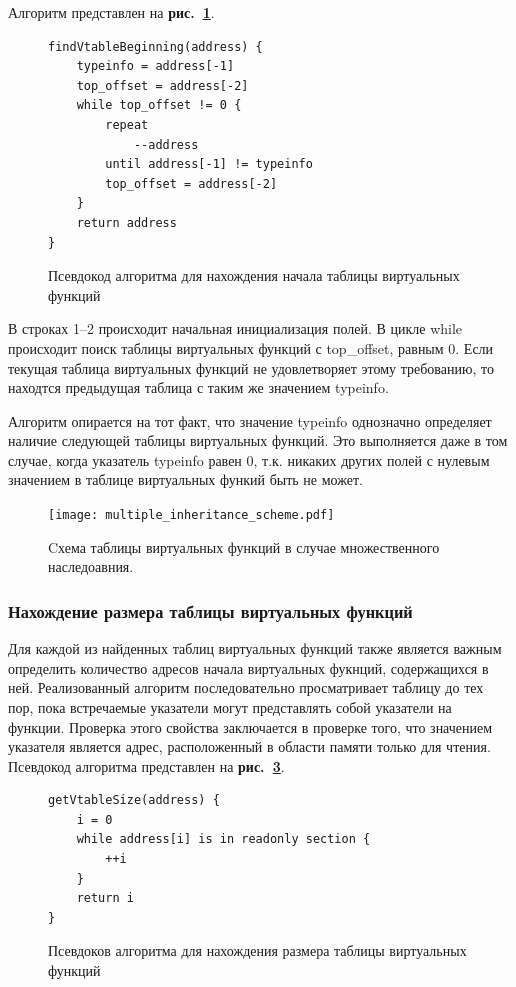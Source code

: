 \documentclass[a4paper,12pt,russian]{article}
\newcommand{\picref}[1]{\textbf{рис.~\ref{#1}}}
\newcommand{\code}[1]{\textsf{#1}}
\begin{document}
Алгоритм представлен на \picref{find_vtable_begin_lst}.
\begin{figure}
\begin{lstlisting}
findVtableBeginning(address) {
    typeinfo = address[-1]
    top_offset = address[-2]
    while top_offset != 0 {
        repeat
            --address
        until address[-1] != typeinfo
        top_offset = address[-2]
    }
    return address
}
\end{lstlisting}
\caption{Псевдокод алгоритма для нахождения начала таблицы виртуальных функций}
\label{find_vtable_begin_lst}
\end{figure}

В строках 1--2 происходит начальная инициализация полей.
В цикле \code{while} происходит поиск таблицы виртуальных функций с \code{top\_offset}, равным 0.
Если текущая таблица виртуальных функций не удовлетворяет этому требованию, то находтся предыдущая таблица с таким же значением \code{typeinfo}.

Алгоритм опирается на тот факт, что значение \code{typeinfo} однозначно определяет наличие следующей таблицы виртуальных функций.
Это выполняется даже в том случае, когда указатель \code{typeinfo} равен 0, т.к. никаких других полей с нулевым значением в таблице виртуальных функий быть не может.

\begin{figure}
  \center
  \texttt{[image: multiple\_inheritance\_scheme.pdf]}
  \hfill
  \caption{Cхема таблицы виртуальных функций в случае множественного наследоавния.}
  \label{multiple_inheritance_scheme_fig}
\end{figure}

\subsubsection{Нахождение размера таблицы виртуальных функций}
Для каждой из найденных таблиц виртуальных функций также является важным определить количество адресов начала виртуальных фукнций, содержащихся в ней.
Реализованный алгоритм последовательно просматривает таблицу до тех пор, пока встречаемые указатели могут представлять собой указатели на функции.
Проверка этого свойства заключается в проверке того, что значением указателя является адрес, расположенный в области памяти только для чтения.
Псевдокод алгоритма представлен на \picref{find_vtable_size_lst}.
\begin{figure}
\begin{lstlisting}
getVtableSize(address) {
    i = 0
    while address[i] is in readonly section {
        ++i
    }
    return i
}
\end{lstlisting}
\caption{Псевдоков алгоритма для нахождения размера таблицы виртуальных функций}
\label{find_vtable_size_lst}
\end{figure}
\end{document}
